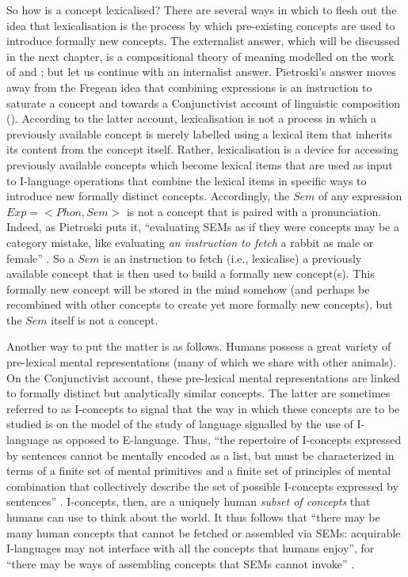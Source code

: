 So how is a concept lexicalised? There are several ways in which to flesh out the idea that lexicalisation is the process by which pre-existing concepts are used to introduce formally new concepts. The externalist answer, which will be discussed in the next chapter, is a compositional theory of meaning modelled on the work of \citet{Davidson1967,Davidson1973} and \citet{Montague1974}; but let us continue with an internalist answer. Pietroski’s answer moves away from the Fregean idea that combining expressions is an instruction to saturate a concept and towards a Conjunctivist account of linguistic composition (\citealt{HornsteinPietroski2009,Pietroski2018}). According to the latter account, lexicalisation is not a process in which a previously available concept is merely labelled using a lexical item that inherits its content from the concept itself. Rather, lexicalisation is a device for accessing previously available concepts which become lexical items that are used as input to I-language operations that combine the lexical items in specific ways to introduce new formally distinct concepts. Accordingly, the $Sem$ of any expression $Exp = <Phon,Sem>$ is not a concept that is paired with a pronunciation. Indeed, as Pietroski puts it, “evaluating SEMs as if they were concepts may be a category mistake, like evaluating \textit{an instruction to fetch} a rabbit as male or female” \citep[252, emphasis in original]{Pietroski2010}. So a $Sem$ is an instruction to fetch (i.e., lexicalise) a previously available concept that is then used to build a formally new concept(s). This formally new concept will be stored in the mind somehow (and perhaps be recombined with other concepts to create yet more formally new concepts), but the $Sem$ itself is not a concept. 
	
Another way to put the matter is as follows. Humans possess a great variety of pre-lexical mental representations (many of which we share with other animals). On the Conjunctivist account, these pre-lexical mental representations are linked to formally distinct but analytically similar concepts. The latter are sometimes referred to as I-concepts \citep{Jackendoff1989,Jackendoff1990} to signal that the way in which these concepts are to be studied is on the model of the study of language signalled by the use of I-language as opposed to E-language. Thus, “the repertoire of I-concepts expressed by sentences cannot be mentally encoded as a list, but must be characterized in terms of a finite set of mental primitives and a finite set of principles of mental combination that collectively describe the set of possible I-concepts expressed by sentences” \citep[9]{Jackendoff1990}. I-concepts, then, are a uniquely human \textit{subset of concepts} that humans can use to think about the world. It thus follows that “there may be many human concepts that cannot be fetched or assembled via SEMs: acquirable I-languages may not interface with all the concepts that humans enjoy”, for “there may be ways of assembling concepts that SEMs cannot invoke” \citep[325]{LohndalPietroski2018}.
	
